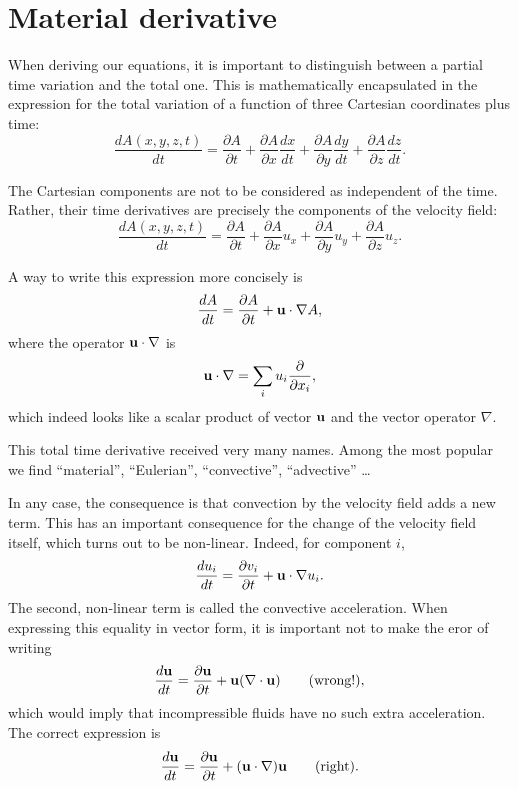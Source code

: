 \section{Material derivative}

When deriving our equations, it is important to distinguish between
a partial time variation and the total one. This is mathematically
encapsulated in the expression for the total variation of a function
of three Cartesian coordinates plus time:
\[
\frac{d A(x,y,z,t) }{dt} =
\frac{\partial A }{\partial t} +
\frac{\partial A }{\partial x} \frac{dx }{dt} +
\frac{\partial A }{\partial y} \frac{dy }{dt} +
\frac{\partial A }{\partial z} \frac{dz }{dt} .
\]


The Cartesian components are not to be considered as independent of
the time. Rather, their time derivatives are precisely the components
of the velocity field:
\[
\frac{d A(x,y,z,t) }{dt} =
\frac{\partial A }{\partial t} +
\frac{\partial A }{\partial x} u_x +
\frac{\partial A }{\partial y} u_y +
\frac{\partial A }{\partial z} u_z .
\]

A way to write this expression more concisely is
\[
\frac{d A }{dt} =
\frac{\partial A }{\partial t} +
\mathbf{u} \cdot \nabla A ,
\]
where the operator $\mathbf{u} \cdot \nabla$ is
\[
\mathbf{u} \cdot \nabla  =
\sum_i u_i \frac{\partial  }{\partial x_i} ,
\]
which indeed looks like a scalar product of vector $\mathbf{u}$ and the
vector operator $\nabla$.

This total time derivative received very many names. Among the most
popular we find ``material'', ``Eulerian'', ``convective'',
``advective''  \ldots

In any case, the consequence is that convection by the velocity field
adds a new term. This has an important consequence for the change
of the velocity field itself, which turns out to be non-linear. Indeed,
for component $i$,
\[
\frac{d u_i }{dt} =
\frac{\partial v_i }{\partial t} +
\mathbf{u} \cdot \nabla u_i .
\]
The second, non-linear term is called the convective
acceleration. When expressing this
equality in vector form, it is important not to make the eror of
writing
\[
\frac{d \mathbf{u}  }{dt} =
\frac{\partial \mathbf{u} }{\partial t} +
\mathbf{u}  ( \nabla \cdot \mathbf{u} ) \qquad \text{(wrong!)} ,
\]
which would imply that incompressible fluids have no such extra
acceleration. The correct expression is
\[
\frac{d \mathbf{u}  }{dt} =
\frac{\partial \mathbf{u} }{\partial t} +
(\mathbf{u} \cdot  \nabla ) \mathbf{u}  \qquad \text{(right)} .
\]

